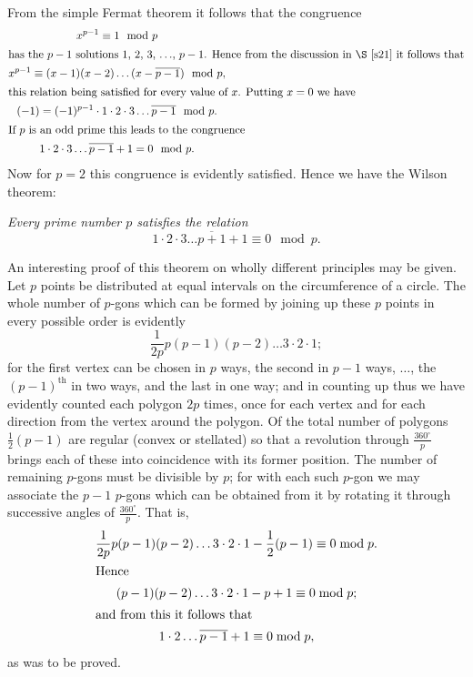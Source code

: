 \documentclass[oneside]{book}
\begin{document}
From the simple Fermat theorem it follows that the congruence
\begin{gather*}
x^{p-1} \equiv 1\mod p \\
\intertext{has the $p-1$ solutions $1$, $2$, $3$, $\ldots$, $p-1$.
Hence from the discussion in \S \ref{s21} it follows that}
x^{p-1} \equiv (x-1)(x-2)\ldots(x-\overline{p-1}) \mod p, \\
\intertext{this relation being satisfied for every value of $x$.
Putting $x = 0$ we have}
(-1) = (-1)^{p - 1}\cdot 1\cdot 2\cdot 3 \ldots
           \overline{p-1}\mod p.  \\
\intertext{If $p$ is an odd prime this leads to the congruence}
1 \cdot 2 \cdot 3 \ldots \overline{p-1} + 1 = 0 \mod p.
\end{gather*}
Now for $p = 2$ this congruence is evidently satisfied. Hence
we have the Wilson theorem:

\smallskip \emph{Every prime number $p$ satisfies the relation}
\begin{equation*}
1 \cdot 2 \cdot 3 \ldots \overline{p+1} + 1 \equiv 0 \mod p.
\end{equation*}

An interesting proof of this theorem on wholly different principles
may be given. Let $p$ points be distributed at equal intervals on
the circumference of a circle. The whole number of $p$-gons which
can be formed by joining up these $p$ points in every possible order
is evidently
\begin{equation*}
\frac{1}{2p} p (p-1) (p-2) \ldots 3 \cdot 2 \cdot 1;
\end{equation*}
for the first vertex can be chosen in $p$ ways, the second in $p -
1$ ways, $\ldots$, the $(p-1)^{\mathrm{th}}$ in two ways, and the
last in one way; and in counting up thus we have evidently counted
each polygon $2p$ times, once for each vertex and for each direction
from the vertex around the polygon. Of the total number of polygons
$\frac{1}{2}(p-1)$ are regular (convex or stellated) so that a
revolution through $\frac{360^\circ}{p}$ brings each of these into
coincidence with its former position. The number of remaining
$p$-gons must be divisible by $p$; for with each such $p$-gon we may
associate the $p-1$ $p$-gons which can be obtained from it by
rotating it through successive angles of $\frac{360^\circ}{p}$. That
is,
\begin{gather*}
\frac{1}{2p} p (p-1) (p-2) \ldots 3 \cdot 2 \cdot 1 -
  \frac 12 (p-1) \equiv 0 \bmod p. \\
\intertext{Hence}
(p-1) (p-2) \ldots 3 \cdot 2 \cdot 1 -  p + 1 \equiv 0 \bmod p; \\
\intertext{and from this it follows that}
1 \cdot 2 \ldots \overline{p-1} + 1 \equiv 0 \bmod p, \\
\end{gather*}
as was to be proved.
\end{document}

